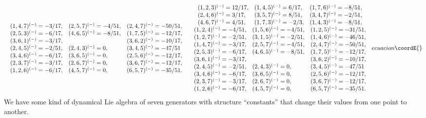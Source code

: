 \documentclass[a4paper,12pt]{book}
\begin{document}
\begin{itemize}
\begin{equation}
{\begin{array}{c}
\begin{array}{lll}
(1,4,7)^{(-)}=-3/17, & (2,5,7)^{(-)}=-4/51, & (2,4,7)^{(-)}=-50/51, \\ 
(2,5,3)^{(-)}=-6/17, & (4,6,5)^{(-)}=-8/51, & (1,7,5)^{(-)}=-12/17, \\ 
(3,6,1)^{(-)}=-3/17, &  & (3,6,2)^{(-)}=-10/17, \\ 
(2,4,5)^{(-)}=-2/51, & (2,4,3)^{(-)}=0, & (3,4,5)^{(-)}=-47/51 \\ 
(3,4,6)^{(-)}=-6/17, & (3,6,5)^{(-)}=0, & (2,5,6)^{(-)}=-12/17, \\ 
(2,3,7)^{(-)}=-3/17, & (2,6,7)^{(-)}=0, & (3,6,7)^{(-)}=-12/17, \\ 
(1,2,6)^{(-)}=-6/17, & (4,5,7)^{(-)}=0, & (6,5,7)^{(-)}=-35/51.
\end{array}
\end{array}
\label{xxx2}
}{
\begin{array}{c}
\begin{array}{lll}
(1,2,3)^{(-)}=12/17, & (1,4,5)^{(-)}=6/17, & (1,7,6)^{(-)}=-8/51, \\ 
(2,4,6)^{(-)}=3/17, & (3,5,7)^{(-)}=8/51, & (3,4,7)^{(-)}=-2/51, \\ 
(4,6,7)^{(-)}=4/51, & (1,7,3)^{(-)}=-2/3, & (1,4,3)^{(-)}=-8/51,
\end{array}
\\ 
\begin{array}{lll}
(1,2,4)^{(-)}=-4/51, & (1,5,6)^{(-)}=-4/51, & (1,2,5)^{(-)}=-31/51, \\ 
(1,2,7)^{(-)}=-2/51, & (3,1,5)^{(-)}=-2/51, & (1,4,6)^{(-)}=-46/51, \\ 
(1,4,7)^{(-)}=-3/17, & (2,5,7)^{(-)}=-4/51, & (2,4,7)^{(-)}=-50/51, \\ 
(2,5,3)^{(-)}=-6/17, & (4,6,5)^{(-)}=-8/51, & (1,7,5)^{(-)}=-12/17, \\ 
(3,6,1)^{(-)}=-3/17, &  & (3,6,2)^{(-)}=-10/17, \\ 
(2,4,5)^{(-)}=-2/51, & (2,4,3)^{(-)}=0, & (3,4,5)^{(-)}=-47/51 \\ 
(3,4,6)^{(-)}=-6/17, & (3,6,5)^{(-)}=0, & (2,5,6)^{(-)}=-12/17, \\ 
(2,3,7)^{(-)}=-3/17, & (2,6,7)^{(-)}=0, & (3,6,7)^{(-)}=-12/17, \\ 
(1,2,6)^{(-)}=-6/17, & (4,5,7)^{(-)}=0, & (6,5,7)^{(-)}=-35/51.
\end{array}
\end{array}
}{ecuacion}\coordE{}\end{equation}
We have some kind of dynamical Lie algebra of seven generators with
structure ``constants'' that change their values from one point to another.

\end{itemize}
\end{document}
